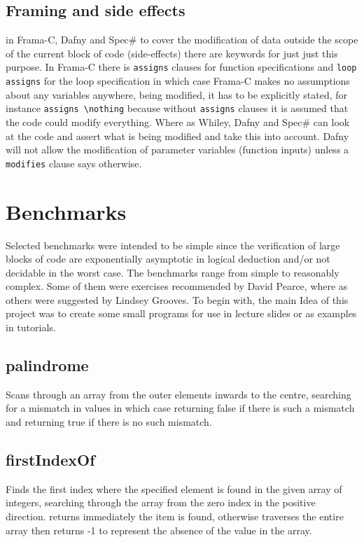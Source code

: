 \documentclass[10pt]{article} %
\begin{document}
\subsection{Framing and side effects}
in Frama-C, Dafny and Spec\# to cover the modification of data outside the scope of the current block of code (side-effects) there are keywords for just just this purpose. In Frama-C there is \verb/assigns/ clauses for function specifications and \verb/loop assigns/ for the loop specification in which case Frama-C makes no assumptions about any variables anywhere, being modified, it has to be explicitly stated, for instance \verb/assigns \nothing/ because without \verb/assigns/ clauses it is assumed that the code could modify everything. Where as Whiley, Dafny and Spec\# can look at the code and assert what is being modified and take this into account. Dafny will not allow the modification of parameter variables (function inputs) unless a \verb/modifies/ clause says otherwise.

\section{Benchmarks}
Selected benchmarks were intended to be simple since the verification of large blocks of code are exponentially asymptotic in logical deduction and\slash or not decidable in the worst case. The benchmarks range from simple to reasonably complex. Some of them were exercises recommended by David Pearce, where as others were suggested by Lindsey Grooves. To begin with, the main Idea of this project was to create some small programs for use in lecture slides or as examples in tutorials. 

\subsection{palindrome} 
Scans through an array from the outer elements inwards to the centre, searching for a mismatch in values in which case returning false if there is such a mismatch and returning true if there is no such mismatch.

\subsection{firstIndexOf}
Finds the first index where the specified element is found in the given array of integers, searching through the array from the zero index in the positive direction. returns immediately the item is found, otherwise traverses the entire array then returns -1 to represent the absence of the value in the array.
\end{document}
